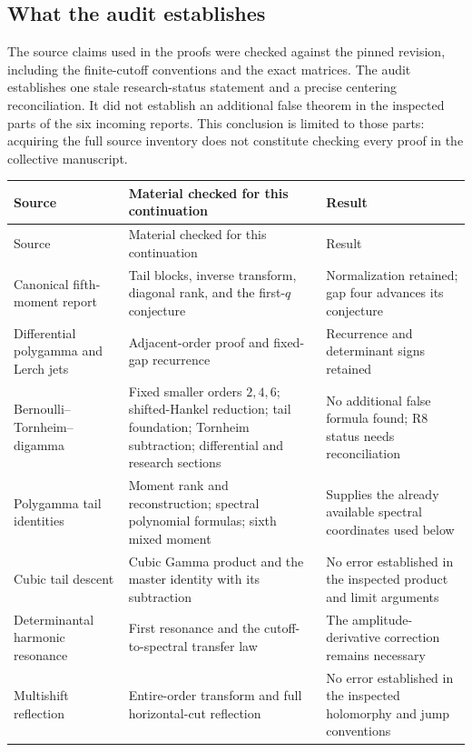 \documentclass[11pt]{article}
\theoremstyle{definition}
\theoremstyle{remark}
\numberwithin{equation}{section}
\begin{document}
\subsection{What the audit establishes}

The source claims used in the proofs were checked against the pinned
revision, including the finite-cutoff conventions and the exact matrices.
The audit establishes one stale research-status statement and a precise
centering reconciliation. It did not establish an additional false theorem
in the inspected parts of the six incoming reports. This conclusion is
limited to those parts: acquiring the full source inventory does not
constitute checking every proof in the collective manuscript.

\begin{longtable}{@{}>{\raggedright\arraybackslash}p{}>{\raggedright\arraybackslash}p{}>{\raggedright\arraybackslash}p{}@{}}
\toprule
Source & Material checked for this continuation & Result \\
\midrule
\endfirsthead
\toprule
Source & Material checked for this continuation & Result \\
\midrule
\endhead
Canonical fifth-moment report \cite{Canonical} &
Tail blocks, inverse transform, diagonal rank, and the first-$q$ conjecture &
Normalization retained; gap four advances its conjecture \\
Differential polygamma and Lerch jets \cite{Differential} &
Adjacent-order proof and fixed-gap recurrence &
Recurrence and determinant signs retained \\
Bernoulli--Tornheim--digamma \cite{Bernoulli} &
Fixed smaller orders $2,4,6$; shifted-Hankel reduction; tail foundation;
Tornheim subtraction; differential and research sections &
No additional false formula found; R8 status needs reconciliation \\
Polygamma tail identities \cite{Polygamma} &
Moment rank and reconstruction; spectral polynomial formulas; sixth
mixed moment &
Supplies the already available spectral coordinates used below \\
Cubic tail descent \cite{Cubic} &
Cubic Gamma product and the master identity with its subtraction &
No error established in the inspected product and limit arguments \\
Determinantal harmonic resonance \cite{Resonance} &
First resonance and the cutoff-to-spectral transfer law &
The amplitude-derivative correction remains necessary \\
Multishift reflection \cite{Multishift} &
Entire-order transform and full horizontal-cut reflection &
No error established in the inspected holomorphy and jump conventions \\
\bottomrule
\end{longtable}
\end{document}
